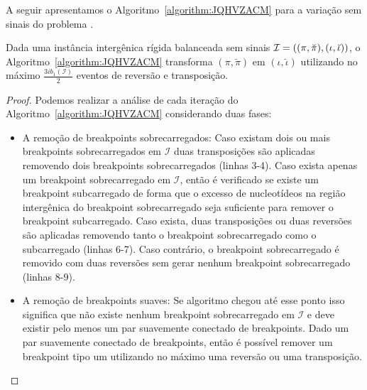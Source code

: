 A seguir apresentamos o Algoritmo~\ref{algorithm:JQHVZACM} para a variação sem sinais do problema \SbIRT{}.



\begin{lemma}\label{lemma:RNJHXOWZ}
Dada uma instância intergênica rígida balanceada sem sinais $\mathcal{I}=((\pi,\breve\pi),\break(\iota,\breve\iota))$, o Algoritmo~\ref{algorithm:JQHVZACM} transforma $(\pi,\breve\pi)$ em $(\iota,\breve\iota)$ utilizando no máximo $\frac{3ib_1(\mathcal{I})}{2}$ eventos de reversão e transposição.
\end{lemma}
\begin{proof}
Podemos realizar a análise de cada iteração do Algoritmo~\ref{algorithm:JQHVZACM} considerando duas fases:
\begin{itemize}
  \item A remoção de breakpoints sobrecarregados: Caso existam dois ou mais breakpoints sobrecarregados em $\mathcal{I}$ duas transposições são aplicadas removendo dois breakpoints sobrecarregados (linhas 3-4). Caso exista apenas um breakpoint sobrecarregado em $\mathcal{I}$, então é verificado se existe um breakpoint subcarregado de forma que o excesso de nucleotídeos na região intergênica do breakpoint sobrecarregado seja suficiente para remover o breakpoint subcarregado. Caso exista, duas transposições ou duas reversões são aplicadas removendo tanto o breakpoint sobrecarregado como o subcarregado (linhas 6-7). Caso contrário, o breakpoint sobrecarregado é removido com duas reversões sem gerar nenhum breakpoint sobrecarregado (linhas 8-9).
  \item A remoção de breakpoints suaves: Se algoritmo chegou até esse ponto isso significa que não existe nenhum breakpoint sobrecarregado em $\mathcal{I}$ e deve existir pelo menos um par suavemente conectado de breakpoints. Dado um par suavemente conectado de breakpoints, então é possível remover um breakpoint tipo um utilizando no máximo uma reversão ou uma transposição.
\end{itemize}

\end{proof}
